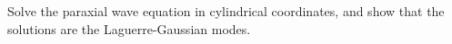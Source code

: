 %

\begin{exercicio}
Solve the paraxial wave equation in cylindrical coordinates, and show that the solutions are the Laguerre-Gaussian modes.
\end{exercicio}

